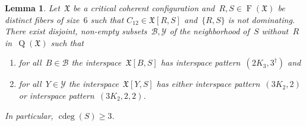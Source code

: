 \documentclass[english,a4paper]{article}
\theoremstyle{plain}
\newtheorem{lemma}      [theorem]{Lemma}
\theoremstyle{definition}
\DeclareMathOperator{\Fibers}{F}
\newcommand{\coherentConfig}{\ensuremath{\mathfrak{X}}}
\newcommand{\fibers}[1]{\ensuremath{\Fibers \left( #1 \right)}}
\newcommand{\interspace}[2]{\ensuremath{\coherentConfig[#1,#2]}}
\DeclareMathOperator*{\Quotient}{Q}
\newcommand{\quotientGraph}[1]{\ensuremath{\Quotient(#1)}}
\DeclareMathOperator{\ColorDeg}{cdeg}
\newcommand{\colorDeg}[1]{\ensuremath{\ColorDeg\left(#1\right)}}
\newcommand{\ipsixMatching}             {\ensuremath{(\disjointCliques{3}{2},2)}}
\newcommand{\ipsixMatchingTwice}        {\ensuremath{(\disjointCliques{3}{2},2,2)}}
\newcommand{\ipsixTriangle}               {\ensuremath{(\disjointCliques{2}{3},3^\dag)}}
\newcommand{\clique}[1]{\ensuremath{K_{#1}}}
\newcommand{\cycle}[1]{\ensuremath{C_{#1}}}
\newcommand{\disjointCliques}[2]{\ensuremath{#1 \clique{#2}}}
\begin{document}
\begin{lemma}
    \label{critical:6-cc:restorable:cycle/lem}
    Let~$\coherentConfig$ be a critical coherent configuration and~$R,S \in \fibers{\coherentConfig}$ be distinct fibers of size~$6$ such that $\cycle{12} \in \interspace{R}{S}$ and~$\{R,S\}$ is not dominating.
    There exist disjoint, non-empty subsets~$\mathcal{B}, \mathcal{Y}$ of the neighborhood of~$S$ without~$R$ in~$\quotientGraph{\coherentConfig}$ such that
    \begin{enumerate}
        \item for all~$B \in \mathcal{B}$ the interspace~$\interspace{B}{S}$ has interspace pattern~$\ipsixTriangle$ and
        \item for all~$Y \in \mathcal{Y}$ the interspace~$\interspace{Y}{S}$ has either interspace pattern~$\ipsixMatching$ or interspace pattern~$\ipsixMatchingTwice$.
    \end{enumerate}
    In particular, $\colorDeg{S} \geq 3$.
\end{lemma}
\end{document}
